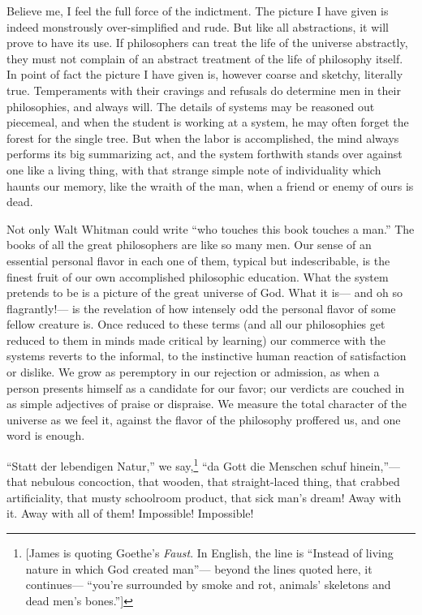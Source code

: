 \documentclass[]{article}
\begin{document}
Believe me, I feel the full force of the indictment. The picture I
have given is indeed monstrously over-simplified and rude. But like all
abstractions, it will prove to have its use. If philosophers can treat
the life of the universe abstractly, they must not complain of an
abstract treatment of the life of philosophy itself. In point of fact
the picture I have given is, however coarse and sketchy, literally true.
Temperaments with their cravings and refusals do determine men in their
philosophies, and always will. The details of systems may be reasoned
out piecemeal, and when the student is working at a system, he may
often forget the forest for the single tree. But when the labor is
accomplished, the mind always performs its big summarizing act, and the
system forthwith stands over against one like a living thing, with that
strange simple note of individuality which haunts our memory, like the
wraith of the man, when a friend or enemy of ours is dead.

Not only Walt Whitman could write ``who touches this book touches a man.''
The books of all the great philosophers are like so many men. Our
sense of an essential personal flavor in each one of them, typical but
indescribable, is the finest fruit of our own accomplished philosophic
education. What the system pretends to be is a picture of the great
universe of God. What it is--- and oh so flagrantly!--- is the revelation of
how intensely odd the personal flavor of some fellow creature is. Once
reduced to these terms (and all our philosophies get reduced to them in
minds made critical by learning) our commerce with the systems reverts
to the informal, to the instinctive human reaction of satisfaction or
dislike. We grow as peremptory in our rejection or admission, as when a
person presents himself as a candidate for our favor; our verdicts are
couched in as simple adjectives of praise or dispraise. We measure the
total character of the universe as we feel it, against the flavor of the
philosophy proffered us, and one word is enough.

``Statt der lebendigen Natur,'' we say,\footnote{[James is quoting Goethe's \emph{Faust}. In English, the line is ``Instead of living nature in which God created man''--- beyond the lines quoted here, it continues--- ``you're surrounded by smoke and rot, animals' skeletons and dead men's bones.'']} ``da Gott die Menschen schuf
hinein,''--- that nebulous concoction, that wooden, that straight-laced
thing, that crabbed artificiality, that musty schoolroom product, that
sick man's dream! Away with it. Away with all of them! Impossible!
Impossible!
\end{document}
